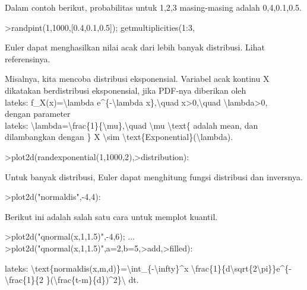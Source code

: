 \documentclass[a4paper,10pt]{article}
\begin{document}
\begin{eulernotebook}
\begin{eulercomment}
\begin{eulercomment}
\begin{eulercomment}
Dalam contoh berikut, probabilitas untuk 1,2,3 masing-masing adalah
0,4,0.1,0.5.
\end{eulercomment}
\begin{eulerprompt}
>randpint(1,1000,[0.4,0.1,0.5]); getmultiplicities(1:3,%
\end{eulerprompt}
\begin{euleroutput}
  [394,  107,  499]
\end{euleroutput}
\begin{eulercomment}
Euler dapat menghasilkan nilai acak dari lebih banyak distribusi.
Lihat referensinya.

Misalnya, kita mencoba distribusi eksponensial. Variabel acak kontinu
X dikatakan berdistribusi eksponensial, jika PDF-nya diberikan oleh\\
lateks: f\_X(x)=\textbackslash{}lambda e\textasciicircum{}\{-\textbackslash{}lambda x\},\textbackslash{}quad x\textgreater{}0,\textbackslash{}quad \textbackslash{}lambda\textgreater{}0,\\
dengan parameter\\
lateks: \textbackslash{}lambda=\textbackslash{}frac\{1\}\{\textbackslash{}mu\},\textbackslash{}quad \textbackslash{}mu \textbackslash{}text\{ adalah mean, dan
dilambangkan dengan \} X \textbackslash{}sim \textbackslash{}text\{Exponential\}(\textbackslash{}lambda).
\end{eulercomment}
\begin{eulerprompt}
>plot2d(randexponential(1,1000,2),>distribution):
\end{eulerprompt}
\begin{eulercomment}
Untuk banyak distribusi, Euler dapat menghitung fungsi distribusi dan
inversnya.
\end{eulercomment}
\begin{eulerprompt}
>plot2d("normaldis",-4,4): 
\end{eulerprompt}
\begin{eulercomment}
Berikut ini adalah salah satu cara untuk memplot kuantil.
\end{eulercomment}
\begin{eulerprompt}
>plot2d("qnormal(x,1,1.5)",-4,6);  ...
>plot2d("qnormal(x,1,1.5)",a=2,b=5,>add,>filled):
\end{eulerprompt}
\begin{eulercomment}
lateks: \textbackslash{}text\{normaldis(x,m,d)\}=\textbackslash{}int\_\{-\textbackslash{}infty\}\textasciicircum{}x
\textbackslash{}frac\{1\}\{d\textbackslash{}sqrt\{2\textbackslash{}pi\}\}e\textasciicircum{}\{-\textbackslash{}frac\{1\}\{2 \}(\textbackslash{}frac\{t-m\}\{d\})\textasciicircum{}2\}\textbackslash{} dt.\\

\end{eulercomment}
\end{eulercomment}
\end{eulercomment}
\end{eulernotebook}
\end{document}
